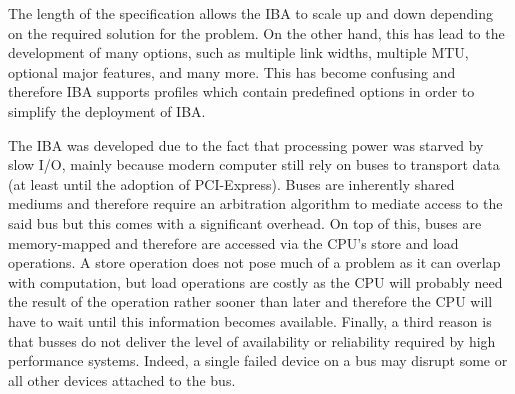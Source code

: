 	
		
The length of the specification allows the IBA to scale up and down depending on the required solution for the problem. On the other hand, this has lead to the development of many options, such as multiple link widths, multiple MTU, optional major features, and many more. This has become confusing and therefore IBA supports profiles which contain predefined options in order to simplify the deployment of IBA. 

	
The IBA was developed due to the fact that processing power was starved by slow I/O, mainly because modern computer still rely on buses to transport data (at least until the adoption of PCI-Express). Buses are inherently shared mediums and therefore require an arbitration algorithm to mediate access to the said bus but this comes with a significant overhead. On top of this, buses are memory-mapped and therefore are accessed via the CPU's store and load operations. A store operation does not  pose much of a problem as it can overlap with computation, but load operations are costly as the CPU will probably need the result of the operation rather sooner than later and therefore the CPU will have to wait until this information becomes available. Finally, a third reason is that busses do not deliver the level of availability or reliability required by high performance systems. Indeed, a single failed device on a bus may disrupt some or all other devices attached to the bus.


